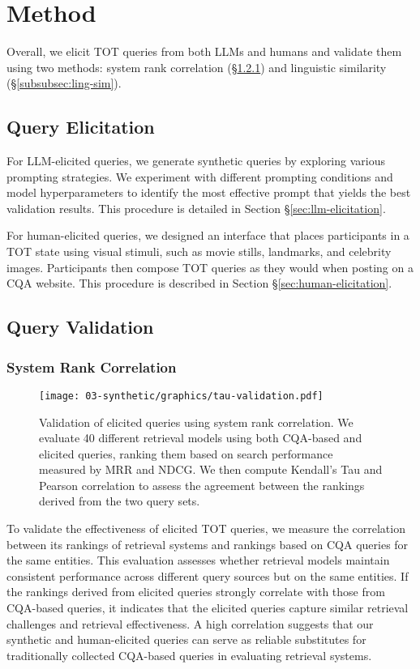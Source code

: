 \section{Method}
Overall, we elicit TOT queries from both LLMs and humans and validate them using two methods: system rank correlation (\S\ref{subsubsec:sys-rank-correlation}) and linguistic similarity (\S\ref{subsubsec:ling-sim}).

\subsection{Query Elicitation}
For LLM-elicited queries, we generate synthetic queries by exploring various prompting strategies. We experiment with different prompting conditions and model hyperparameters to identify the most effective prompt that yields the best validation results.  
This procedure is detailed in Section \S\ref{sec:llm-elicitation}.  

For human-elicited queries, we designed an interface that places participants in a TOT state using visual stimuli, such as movie stills, landmarks, and celebrity images. Participants then compose TOT queries as they would when posting on a CQA website.  
This procedure is described in Section \S\ref{sec:human-elicitation}.


\subsection{Query Validation}

\subsubsection{\textbf{System Rank Correlation}}\label{subsubsec:sys-rank-correlation}
\begin{figure} 
\centering
\texttt{[image: 03-synthetic/graphics/tau-validation.pdf]}
\caption{
Validation of elicited queries using system rank correlation. We evaluate 40 different retrieval models using both CQA-based and elicited queries, ranking them based on search performance measured by MRR and NDCG. We then compute Kendall’s Tau and Pearson correlation to assess the agreement between the rankings derived from the two query sets.
}
\label{fig:validation-sys-rank}
\end{figure}

To validate the effectiveness of elicited TOT queries, we measure the correlation between its rankings of retrieval systems and rankings based on CQA queries for the same entities. This evaluation assesses whether retrieval models maintain consistent performance across different query sources but on the same entities. If the rankings derived from elicited queries strongly correlate with those from CQA-based queries, it indicates that the elicited queries capture similar retrieval challenges and retrieval effectiveness. A high correlation suggests that our synthetic and human-elicited queries can serve as reliable substitutes for traditionally collected CQA-based queries in evaluating retrieval systems.

